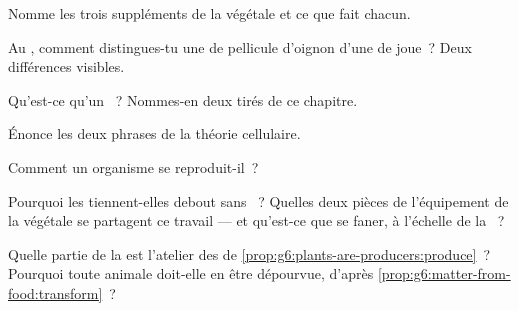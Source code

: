 \begin{exercise}[$\star$]\label{exo:g6:cell-unit-of-life:2}
Nomme les trois suppléments de la  végétale et ce que fait
chacun.
\end{exercise}

\begin{exercise}[$\star$]\label{exo:g6:cell-unit-of-life:3}
Au , comment distingues-tu une  de pellicule
d'oignon d'une  de joue~? Deux différences visibles.
\end{exercise}

\begin{exercise}[$\star$]\label{exo:g6:cell-unit-of-life:4}
Qu'est-ce qu'un  ~? Nommes-en deux tirés de
ce chapitre.
\end{exercise}

\begin{exercise}[$\star$]\label{exo:g6:cell-unit-of-life:5}
Énonce les deux phrases de la théorie cellulaire.
\end{exercise}

\begin{exercise}[$\star$]\label{exo:g6:cell-unit-of-life:6}
Comment un organisme  se reproduit-il~?
\end{exercise}

\begin{exercise}[$\star\star$]\label{exo:g6:cell-unit-of-life:7}
Pourquoi les  tiennent-elles debout sans ~? Quelles deux
pièces de l'équipement de la  végétale se partagent ce
travail --- et qu'est-ce que se faner, à l'échelle de la ~?
\end{exercise}

\begin{exercise}[$\star\star$]\label{exo:g6:cell-unit-of-life:8}
Quelle partie de la  est l'atelier des  de
\cref{prop:g6:plants-are-producers:produce}~? Pourquoi toute 
animale doit-elle en être dépourvue, d'après
\cref{prop:g6:matter-from-food:transform}~?
\end{exercise}

